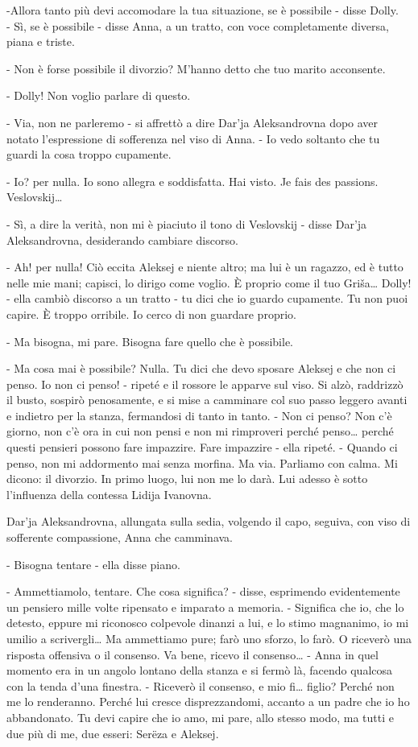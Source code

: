 -Allora tanto più devi accomodare la tua situazione, se è possibile - disse Dolly. \\
- Sì, se è possibile - disse Anna, a un tratto, con voce completamente diversa, piana e triste. 

- Non è forse possibile il divorzio? M'hanno detto che tuo marito acconsente. 

- Dolly! Non voglio parlare di questo. 

- Via, non ne parleremo - si affrettò a dire Dar'ja Aleksandrovna dopo aver notato l'espressione di sofferenza nel viso di Anna. - Io vedo soltanto che tu guardi la cosa troppo cupamente. 

- Io? per nulla. Io sono allegra e soddisfatta. Hai visto. Je fais des passions. Veslovskij\ldots{} 

- Sì, a dire la verità, non mi è piaciuto il tono di Veslovskij - disse Dar'ja Aleksandrovna, desiderando cambiare discorso. 

- Ah! per nulla! Ciò eccita Aleksej e niente altro; ma lui è un ragazzo, ed è tutto nelle mie mani; capisci, lo dirigo come voglio. È proprio come il tuo Griša\ldots{} Dolly! - ella cambiò discorso a un tratto - tu dici che io guardo cupamente. Tu non puoi capire. È troppo orribile. Io cerco di non guardare proprio. 

- Ma bisogna, mi pare. Bisogna fare quello che è possibile. 

- Ma cosa mai è possibile? Nulla. Tu dici che devo sposare Aleksej e che non ci penso. Io non ci penso! - ripeté e il rossore le apparve sul viso. Si alzò, raddrizzò il busto, sospirò penosamente, e si mise a camminare col suo passo leggero avanti e indietro per la stanza, fermandosi di tanto in tanto. - Non ci penso? Non c'è giorno, non c'è ora in cui non pensi e non mi rimproveri perché penso\ldots{} perché questi pensieri possono fare impazzire. Fare impazzire - ella ripeté. - Quando ci penso, non mi addormento mai senza morfina. Ma via. Parliamo con calma. Mi dicono: il divorzio. In primo luogo, lui non me lo darà. Lui adesso è sotto l'influenza della contessa Lidija Ivanovna. 

Dar'ja Aleksandrovna, allungata sulla sedia, volgendo il capo, seguiva, con viso di sofferente compassione, Anna che camminava. 

- Bisogna tentare - ella disse piano. 

- Ammettiamolo, tentare. Che cosa significa? - disse, esprimendo evidentemente un pensiero mille volte ripensato e imparato a memoria. - Significa che io, che lo detesto, eppure mi riconosco colpevole dinanzi a lui, e lo stimo magnanimo, io mi umilio a scrivergli\ldots{} Ma ammettiamo pure; farò uno sforzo, lo farò. O riceverò una risposta offensiva o il consenso. Va bene, ricevo il consenso\ldots{} - Anna in quel momento era in un angolo lontano della stanza e si fermò là, facendo qualcosa con la tenda d'una finestra. - Riceverò il consenso, e mio fi\ldots{} figlio? Perché non me lo renderanno. Perché lui cresce disprezzandomi, accanto a un padre che io ho abbandonato. Tu devi capire che io amo, mi pare, allo stesso modo, ma tutti e due più di me, due esseri: Serëza e Aleksej. 

